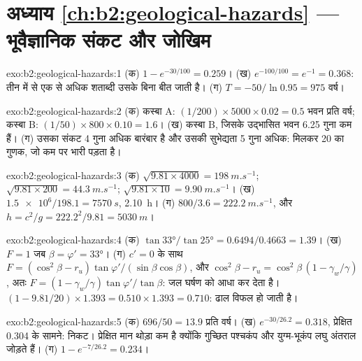 \section*{अध्याय \ref{ch:b2:geological-hazards} --- भूवैज्ञानिक संकट और जोखिम}

\begin{solution}{exo:b2:geological-hazards:1}
(क) $1 - e^{-30/100} = 0.259$। (ख) $e^{-100/100} = e^{-1} = 0.368$: तीन में से एक से अधिक शताब्दी
उसके बिना बीत जाती है। (ग) $T = -50/\ln 0.95 = 975$ वर्ष।
\end{solution}

\begin{solution}{exo:b2:geological-hazards:2}
(क) कस्बा A: $(1/200) \times 5000 \times 0.02 = 0.5$ भवन प्रति वर्ष; कस्बा B: $(1/50) \times 800
\times 0.10 = 1.6$। (ख) कस्बा B, जिसके उद्भासित भवन 6.25 गुना कम हैं। (ग) उसका संकट 4 गुना
अधिक बारंबार है और उसकी सुभेद्यता 5 गुना अधिक: मिलकर 20 का गुणक, जो
कम  पर भारी पड़ता है।
\end{solution}

\begin{solution}{exo:b2:geological-hazards:3}
(क) $\sqrt{9.81 \times 4000} = \qty{198}{m.s^{-1}}$; $\sqrt{9.81 \times 200} = \qty{44.3}{m.s^{-1}}$;
$\sqrt{9.81 \times 10} = \qty{9.90}{m.s^{-1}}$। (ख) $\num{1.5e6}/198.1 = \qty{7570}{s}$, \qty{2.10}{h}।
(ग) $800/3.6 = \qty{222.2}{m.s^{-1}}$, और $h = c^2/g = 222.2^2/9.81 = \qty{5030}{m}$।
\end{solution}

\begin{solution}{exo:b2:geological-hazards:4}
(क) $\tan\ang{33}/\tan\ang{25} = 0.6494/0.4663 = 1.39$। (ख) $F = 1$ जब $\beta = \varphi' =
\ang{33}$। (ग) $c' = 0$ के साथ  $F = (\cos^2\beta - r_u)\tan\varphi'/(\sin\beta\cos\beta)$, और $\cos^2\beta
- r_u = \cos^2\beta\,(1 - \gamma_w/\gamma)$, अतः $F = (1 - \gamma_w/\gamma)\tan\varphi'/\tan\beta$:
जल घर्षण को आधा कर देता है। $(1 - 9.81/20) \times 1.393 = 0.510 \times 1.393 = 0.710$: ढाल
विफल हो जाती है।
\end{solution}

\begin{solution}{exo:b2:geological-hazards:5}
(क) $696/50 = 13.9$ प्रति वर्ष। (ख) $e^{-30/26.2} = 0.318$, प्रेक्षित 0.304 के सामने: निकट। प्रेक्षित
मान थोड़ा कम है क्योंकि गुच्छित पश्चकंप और युग्म-भूकंप लघु अंतराल
जोड़ते हैं। (ग) $1 - e^{-7/26.2} = 0.234$।
\end{solution}

